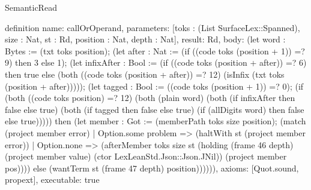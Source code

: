 \begin{lexlean}{SemanticRead}
\begin{semanticmodule}
{definition{
  name: callOrOperand,
  parameters: [toks : (List SurfaceLex::Spanned), size : Nat, st : Rd, position : Nat, depth : Nat],
  result: Rd,
  body: (let word : Bytes := (txt toks position); (let after : Nat := (if ((code toks (position + 1)) =? 9) then 3 else 1); (let infixAfter : Bool := (if ((code toks (position + after)) =? 6) then true else (both ((code toks (position + after)) =? 12) (isInfix (txt toks (position + after))))); (let tagged : Bool := ((code toks (position + 1)) =? 0); (if (both ((code toks position) =? 12) (both (plain word) (both (if infixAfter then false else true) (both (if tagged then false else true) (if (allDigits word) then false else true))))) then (let member : Got := (memberPath toks size position); (match (project member error)
    | Option.some problem => (haltWith st (project member error))
    | Option.none => (afterMember toks size st (holding (frame 46 depth) (project member value) (ctor LexLeanStd.Json::Json.JNil)) (project member pos)))) else (wantTerm st (frame 47 depth) position)))))),
  axioms: [Quot.sound, propext],
  executable: true
}

}
\end{semanticmodule}
\end{lexlean}
